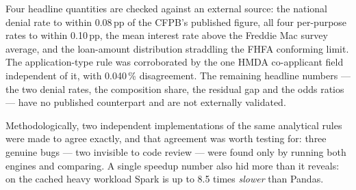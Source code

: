 \documentclass[sigconf,balance=false]{acmart}
\begin{document}
Four headline quantities are checked against an external source: the
national denial rate to within 0.08\,pp of the CFPB's published figure, all
four per-purpose rates to within 0.10\,pp, the mean interest rate above the
Freddie Mac survey average, and the loan-amount distribution straddling the
FHFA conforming limit. The application-type rule was corroborated by the one
HMDA co-applicant field independent of it, with 0.040\,\% disagreement. The
remaining headline numbers --- the two denial rates, the composition share,
the residual gap and the odds ratios --- have no published counterpart and
are not externally validated.

Methodologically, two independent implementations of the same analytical
rules were made to agree exactly, and that agreement was worth testing for:
three genuine bugs --- two invisible to code review --- were found only by
running both engines and comparing. A single speedup number also hid more
than it reveals: on the cached heavy workload Spark is up to 8.5 times
\emph{slower} than Pandas.
\end{document}
